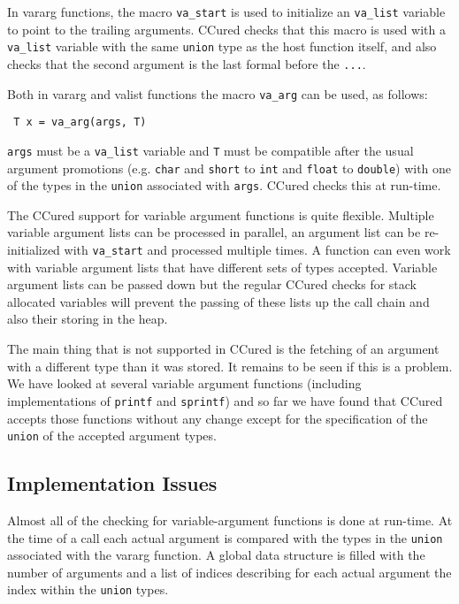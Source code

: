 \documentclass{book}
\def\t#1{{\tt #1}}
\begin{document}
 In vararg functions, the macro \t{va\_start} is used to initialize an
\t{va\_list} variable to point to the trailing arguments. CCured checks that
this macro is used with a \t{va\_list} variable with the same \t{union} type
as the host function itself, and also checks that the second argument is the
last formal before the \t{...}. 

 Both in vararg and valist functions the macro \t{va\_arg} can be used, as
 follows: 
\begin{verbatim}
 T x = va_arg(args, T)
\end{verbatim}

 \t{args} must be a \t{va\_list} variable and \t{T} must be compatible after
the usual argument promotions (e.g. \t{char} and \t{short} to \t{int} and
\t{float} to \t{double}) with one of the types in the \t{union} associated
with \t{args}. CCured checks this at run-time. 

 The CCured support for variable argument functions is quite flexible.
Multiple variable argument lists can be processed in parallel, an argument
list can be re-initialized with \t{va\_start} and processed multiple times. A
function can even work with variable argument lists that have different sets
of types accepted. Variable argument lists can be passed down but the regular
CCured checks for stack allocated variables will prevent the passing of these
lists up the call chain and also their storing in the heap.

 The main thing that is not supported in CCured is the fetching of an argument
with a different type than it was stored. It remains to be seen if this is a
problem. We have looked at several variable argument functions (including
implementations of \t{printf} and \t{sprintf}) and so far we have found that
CCured accepts those functions without any change except for the specification
of the \t{union} of the accepted argument types. 

      \subsection{Implementation Issues}

 Almost all of the checking for variable-argument functions is done at
run-time. At the time of a call each actual argument is compared with the
types in the \t{union} associated with the vararg function. A global data
structure is filled with the number of arguments and a list of indices
describing for each actual argument the index within the \t{union} types. 
\end{document}
